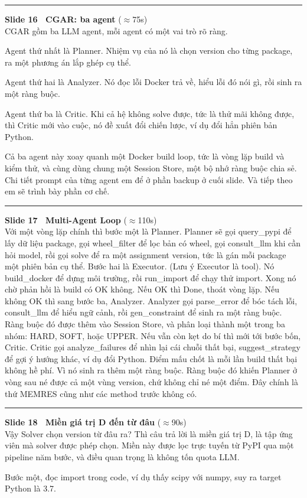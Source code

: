 \documentclass[11pt]{article}
\newcommand{\slidehead}[3]{%
  \vspace{1.05em}\par\noindent
  {\color{accent}\rule[-0.18em]{3pt}{1.05em}}\hspace{0.5em}%
  {\bfseries\large\color{navydeep}Slide #1 \textperiodcentered\ #2}%
  \hfill{\small\color{gray}(#3)}\\[0.25em]%
}
\begin{document}
\slidehead{16}{CGAR: ba agent}{$\approx$75s}
CGAR gồm ba LLM agent, mỗi agent có một vai trò rõ ràng.

Agent thứ nhất là Planner. Nhiệm vụ của nó là chọn version cho từng package, ra một phương án lắp ghép cụ thể.

Agent thứ hai là Analyzer. Nó đọc lỗi Docker trả về, hiểu lỗi đó nói gì, rồi sinh ra một ràng buộc.

Agent thứ ba là Critic. Khi cả hệ không solve được, tức là thử mãi không được, thì Critic mới vào cuộc, nó đề xuất đổi chiến lược, ví dụ đổi hẳn phiên bản Python.

Cả ba agent này xoay quanh một Docker build loop, tức là vòng lặp build và kiểm thử, và cùng dùng chung một Session Store, một bộ nhớ ràng buộc chia sẻ. Chi tiết prompt của từng agent em để ở phần backup ở cuối slide. Và tiếp theo em sẽ trình bày phần cơ chế.

\slidehead{17}{Multi-Agent Loop}{$\approx$110s}
Với một vòng lặp chính thì bước một là Planner. Planner sẽ gọi query\_pypi để lấy dữ liệu package, gọi wheel\_filter để lọc bản có wheel, gọi consult\_llm khi cần hỏi model, rồi gọi solve để ra một assignment version, tức là gán mỗi package một phiên bản cụ thể. Bước hai là Executor. (Lưu ý Executor là tool). Nó build\_docker để dựng môi trường, rồi run\_import để chạy thử import. Xong nó chờ phản hồi là build có OK không. Nếu OK thì Done, thoát vòng lặp. Nếu không OK thì sang bước ba, Analyzer. Analyzer gọi parse\_error để bóc tách lỗi, consult\_llm để hiểu ngữ cảnh, rồi gen\_constraint để sinh ra một ràng buộc. Ràng buộc đó được thêm vào Session Store, và phân loại thành một trong ba nhóm: HARD, SOFT, hoặc UPPER. Nếu vẫn còn kẹt do bí thì mới tới bước bốn, Critic. Critic gọi analyze\_failures để nhìn lại cái chuỗi thất bại, suggest\_strategy để gợi ý hướng khác, ví dụ đổi Python. Điểm mấu chốt là mỗi lần build thất bại không hề phí. Vì nó sinh ra thêm một ràng buộc. Ràng buộc đó khiến Planner ở vòng sau né được cả một vùng version, chứ không chỉ né một điểm. Đây chính là thứ MEMRES cũng như các method trước không có.

\slidehead{18}{Miền giá trị D đến từ đâu}{$\approx$90s}
Vậy Solver chọn version từ đâu ra? Thì câu trả lời là miền giá trị D, là tập ứng viên mà solver được phép chọn. Miền này được lọc trực tuyến từ PyPI qua một pipeline năm bước, và điều quan trọng là không tốn quota LLM.

Bước một, đọc import trong code, ví dụ thấy scipy với numpy, suy ra target Python là 3.7.
\end{document}
